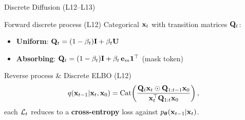 \documentclass{beamer}
\begin{document}
\begin{frame}{Discrete Diffusion (L12--L13)}
	\begin{block}{Forward discrete process (L12)}
		Categorical $\mathbf{x}_t$ with transition matrices $\mathbf{Q}_t$:
		\begin{itemize}
			\item \textbf{Uniform}: $\mathbf{Q}_t = (1-\beta_t)\mathbf{I} + \beta_t\mathbf{U}$
			\item \textbf{Absorbing}: $\mathbf{Q}_t = (1-\beta_t)\mathbf{I} + \beta_t\,\mathbf{e}_m \mathbf{1}^{\top}$ (mask token)
		\end{itemize}
	\end{block}
	\begin{block}{Reverse process \& Discrete ELBO (L12)}
		\vspace{-0.3cm}
		\[
			q(\mathbf{x}_{t-1}|\mathbf{x}_t,\mathbf{x}_0)=\operatorname{Cat}\!\left(\frac{\mathbf{Q}_t \mathbf{x}_t \odot \mathbf{Q}_{1:t-1}\mathbf{x}_0}{\mathbf{x}_t^{\top}\mathbf{Q}_{1:t}\mathbf{x}_0}\right),
		\]
		each $\mathcal{L}_t$ reduces to a \textbf{cross-entropy} loss against $p_{\boldsymbol{\theta}}(\mathbf{x}_{t-1}|\mathbf{x}_t)$.
	\end{block}
\end{frame}
\end{document}
